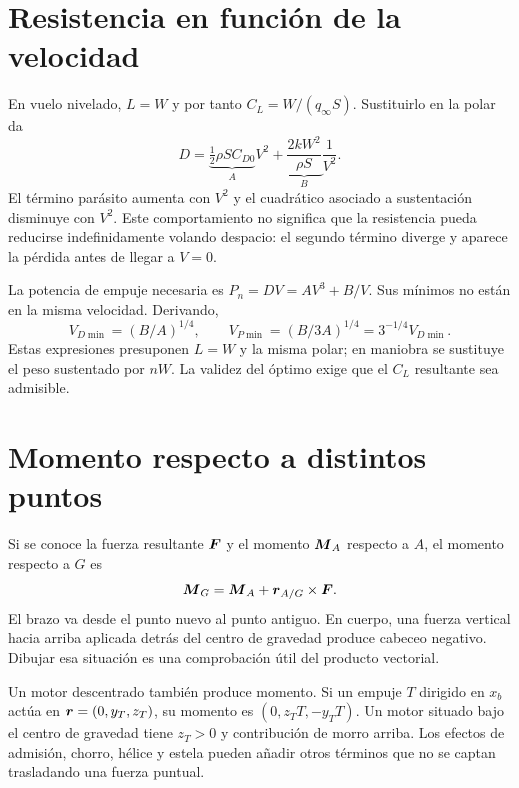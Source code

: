 
\section{Resistencia en función de la velocidad}
En vuelo nivelado, $L=W$ y por tanto $C_L=W/(q_\infty S)$. Sustituirlo en la polar da
\begin{equation}
D=\underbrace{\tfrac12\rho SC_{D0}}_A V^2+
\underbrace{\frac{2kW^2}{\rho S}}_B\frac1{V^2}.
\label{eq:dragAV}
\end{equation}
El término parásito aumenta con $V^2$ y el cuadrático asociado a sustentación disminuye con $V^2$. Este comportamiento no significa que la resistencia pueda reducirse indefinidamente volando despacio: el segundo término diverge y aparece la pérdida antes de llegar a $V=0$.

La potencia de empuje necesaria es $P_n=DV=AV^3+B/V$. Sus mínimos no están en la misma velocidad. Derivando,
\begin{equation}
V_{D\min}=(B/A)^{1/4},\qquad
V_{P\min}=(B/3A)^{1/4}=3^{-1/4}V_{D\min}.
\end{equation}
Estas expresiones presuponen $L=W$ y la misma polar; en maniobra se sustituye el peso sustentado por $nW$. La validez del óptimo exige que el $C_L$ resultante sea admisible.

\section{Momento respecto a distintos puntos}
Si se conoce la fuerza resultante $\boldsymbol{F}$ y el momento $\boldsymbol{M}_A$ respecto a $A$, el momento respecto a $G$ es
\begin{equation}
\boldsymbol{M}_G=\boldsymbol{M}_A+\boldsymbol{r}_{A/G}\times\boldsymbol{F}.
\end{equation}
El brazo va desde el punto nuevo al punto antiguo. En cuerpo, una fuerza vertical hacia arriba aplicada detrás del centro de gravedad produce cabeceo negativo. Dibujar esa situación es una comprobación útil del producto vectorial.

Un motor descentrado también produce momento. Si un empuje $T$ dirigido en $x_b$ actúa en $\boldsymbol{r}=(0,y_T,z_T)$, su momento es $(0,z_TT,-y_TT)$. Un motor situado bajo el centro de gravedad tiene $z_T>0$ y contribución de morro arriba. Los efectos de admisión, chorro, hélice y estela pueden añadir otros términos que no se captan trasladando una fuerza puntual.

